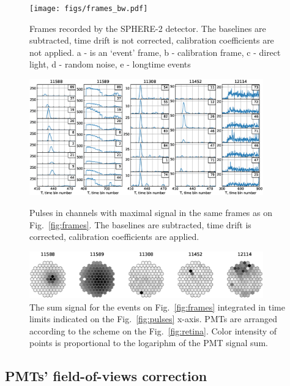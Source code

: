 \documentclass[final,5p,times,twocolumn]{elsarticle}
\begin{document}
\begin{figure}[btp]
    \centering
    \texttt{[image: figs/frames\_bw.pdf]}
    \caption{Frames recorded by the SPHERE-2 detector. The baselines are subtracted, time drift is not corrected, calibration coefficients are not applied. a - is an `event' frame, b - calibration frame, c - direct light, d - random noise, e - longtime events}
    \label{fig:frames}

\includegraphics[width=0.9\textwidth]{figs/pulses.eps}%
\caption{Pulses in channels with maximal signal in the same frames as on Fig.~\ref{fig:frames}. The baselines are subtracted, time drift is corrected, calibration coefficients are applied.}
\label{fig:pulses}
\vspace{1.2pc}
\includegraphics[width=0.9\textwidth]{figs/mosaic_sums_lin.eps}%
\vspace{-1.0pc}
\caption{The sum signal for the events on Fig.~\ref{fig:frames} integrated in time limits indicated on the Fig.~\ref{fig:pulses} x-axis. PMTs are arranged according to the scheme on the Fig.~\ref{fig:retina}. Color intensity of points is proportional to the logariphm of the PMT signal sum.}
\label{fig:mosaic_sum}
\end{figure}



\subsection{PMTs' field-of-views correction}
\end{document}
